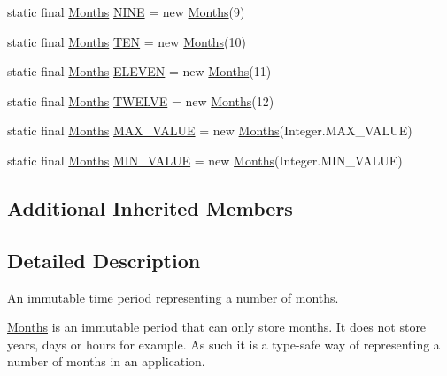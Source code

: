 \begin{DoxyCompactItemize}
\item 
static final \hyperlink{classorg_1_1joda_1_1time_1_1_months}{Months} \hyperlink{classorg_1_1joda_1_1time_1_1_months_a513dd55161ce531a540faa3a09f97bb5}{N\-I\-N\-E} = new \hyperlink{classorg_1_1joda_1_1time_1_1_months}{Months}(9)
\item 
static final \hyperlink{classorg_1_1joda_1_1time_1_1_months}{Months} \hyperlink{classorg_1_1joda_1_1time_1_1_months_ad19ea5259ccdc135061b36ef9aee8709}{T\-E\-N} = new \hyperlink{classorg_1_1joda_1_1time_1_1_months}{Months}(10)
\item 
static final \hyperlink{classorg_1_1joda_1_1time_1_1_months}{Months} \hyperlink{classorg_1_1joda_1_1time_1_1_months_aabf1e5dddc3443a101fbac742932bc24}{E\-L\-E\-V\-E\-N} = new \hyperlink{classorg_1_1joda_1_1time_1_1_months}{Months}(11)
\item 
static final \hyperlink{classorg_1_1joda_1_1time_1_1_months}{Months} \hyperlink{classorg_1_1joda_1_1time_1_1_months_a8c35e13f3b97f8ef723778b04246ead5}{T\-W\-E\-L\-V\-E} = new \hyperlink{classorg_1_1joda_1_1time_1_1_months}{Months}(12)
\item 
static final \hyperlink{classorg_1_1joda_1_1time_1_1_months}{Months} \hyperlink{classorg_1_1joda_1_1time_1_1_months_a7c07b69672d6d8a94472b777724c3a0b}{M\-A\-X\-\_\-\-V\-A\-L\-U\-E} = new \hyperlink{classorg_1_1joda_1_1time_1_1_months}{Months}(Integer.\-M\-A\-X\-\_\-\-V\-A\-L\-U\-E)
\item 
static final \hyperlink{classorg_1_1joda_1_1time_1_1_months}{Months} \hyperlink{classorg_1_1joda_1_1time_1_1_months_a1181aaad3ed5d6f89d9e3cb289dbde25}{M\-I\-N\-\_\-\-V\-A\-L\-U\-E} = new \hyperlink{classorg_1_1joda_1_1time_1_1_months}{Months}(Integer.\-M\-I\-N\-\_\-\-V\-A\-L\-U\-E)
\end{DoxyCompactItemize}
\subsection*{Additional Inherited Members}


\subsection{Detailed Description}
An immutable time period representing a number of months. 

{\ttfamily \hyperlink{classorg_1_1joda_1_1time_1_1_months}{Months}} is an immutable period that can only store months. It does not store years, days or hours for example. As such it is a type-\/safe way of representing a number of months in an application. 

